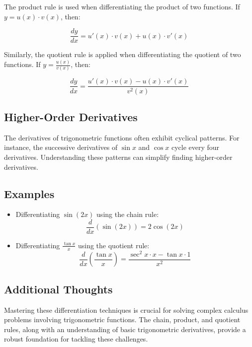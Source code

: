 \documentclass[a4paper,12pt]{book}
\newcounter{problem}
\begin{document}
The product rule is used when differentiating the product of two functions. If \(y = u(x) \cdot v(x)\), then:

\begin{equation}
\frac{dy}{dx} = u'(x) \cdot v(x) + u(x) \cdot v'(x)
\end{equation}

Similarly, the quotient rule is applied when differentiating the quotient of two functions. If \(y = \frac{u(x)}{v(x)}\), then:

\begin{equation}
\frac{dy}{dx} = \frac{u'(x) \cdot v(x) - u(x) \cdot v'(x)}{v^2(x)}
\end{equation}

\subsection*{Higher-Order Derivatives}

The derivatives of trigonometric functions often exhibit cyclical patterns. For instance, the successive derivatives of \(\sin x\) and \(\cos x\) cycle every four derivatives. Understanding these patterns can simplify finding higher-order derivatives.

\subsection*{Examples}

\begin{itemize}
    \item Differentiating \(\sin(2x)\) using the chain rule:
    \begin{equation}
    \frac{d}{dx} (\sin(2x)) = 2 \cos(2x)
    \end{equation}
    
    \item Differentiating \(\frac{\tan x}{x}\) using the quotient rule:
    \begin{equation}
    \frac{d}{dx} \left(\frac{\tan x}{x}\right) = \frac{\sec^2 x \cdot x - \tan x \cdot 1}{x^2}
    \end{equation}
\end{itemize}

\subsection*{Additional Thoughts}

Mastering these differentiation techniques is crucial for solving complex calculus problems involving trigonometric functions. The chain, product, and quotient rules, along with an understanding of basic trigonometric derivatives, provide a robust foundation for tackling these challenges.
\end{document}

